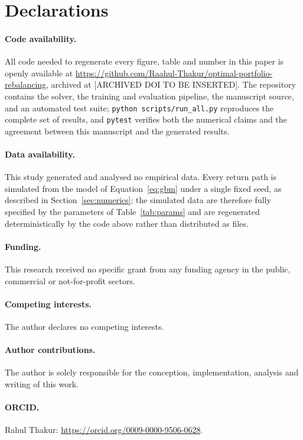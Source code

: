 \documentclass[11pt]{article}
\newcommand{\coderepo}{\url{https://github.com/Raahul-Thakur/optimal-portfolio-rebalancing}}
\newcommand{\codedoi}{[ARCHIVED DOI TO BE INSERTED]}
\newcommand{\authororcid}{\url{https://orcid.org/0009-0000-9506-0628}}
\begin{document}
\section*{Declarations}

\paragraph{Code availability.}
All code needed to regenerate every figure, table and number in this paper is
openly available at \coderepo, archived at \codedoi. The repository contains the
solver, the training and evaluation pipeline, the manuscript source, and an
automated test suite; \texttt{python scripts/run\_all.py} reproduces the
complete set of results, and \texttt{pytest} verifies both the numerical claims
and the agreement between this manuscript and the generated results.

\paragraph{Data availability.}
This study generated and analysed no empirical data. Every return path is
simulated from the model of Equation~\eqref{eq:gbm} under a single fixed seed,
as described in Section~\ref{sec:numerics}; the simulated data are therefore
fully specified by the parameters of Table~\ref{tab:params} and are regenerated
deterministically by the code above rather than distributed as files.

\paragraph{Funding.}
This research received no specific grant from any funding agency in the public,
commercial or not-for-profit sectors.

\paragraph{Competing interests.}
The author declares no competing interests.

\paragraph{Author contributions.}
The author is solely responsible for the conception, implementation, analysis
and writing of this work.

\paragraph{ORCID.}
Rahul Thakur: \authororcid.



\end{document}
